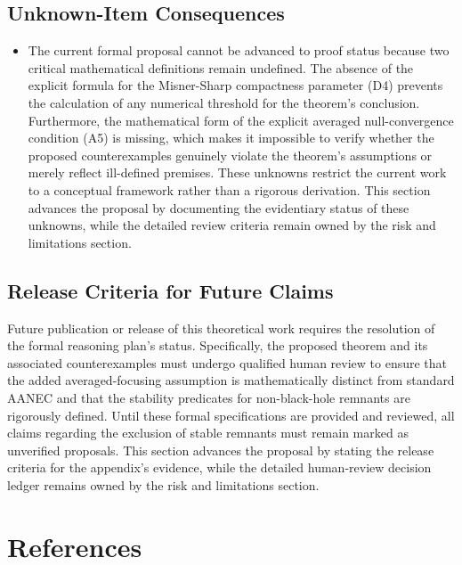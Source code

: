 \documentclass[conference]{IEEEtran}
\begin{document}
\subsection{Unknown-Item Consequences}
\begin{itemize}
\item The current formal proposal cannot be advanced to proof status because two critical mathematical definitions remain undefined. The absence of the explicit formula for the Misner-Sharp compactness parameter (D4) prevents the calculation of any numerical threshold for the theorem's conclusion. Furthermore, the mathematical form of the explicit averaged null-convergence condition (A5) is missing, which makes it impossible to verify whether the proposed counterexamples genuinely violate the theorem's assumptions or merely reflect ill-defined premises. These unknowns restrict the current work to a conceptual framework rather than a rigorous derivation. This section advances the proposal by documenting the evidentiary status of these unknowns, while the detailed review criteria remain owned by the risk and limitations section.
\end{itemize}

\subsection{Release Criteria for Future Claims}
Future publication or release of this theoretical work requires the resolution of the formal reasoning plan's status. Specifically, the proposed theorem and its associated counterexamples must undergo qualified human review to ensure that the added averaged-focusing assumption is mathematically distinct from standard AANEC and that the stability predicates for non-black-hole remnants are rigorously defined. Until these formal specifications are provided and reviewed, all claims regarding the exclusion of stable remnants must remain marked as unverified proposals. This section advances the proposal by stating the release criteria for the appendix's evidence, while the detailed human-review decision ledger remains owned by the risk and limitations section.\section*{References}


\end{document}
